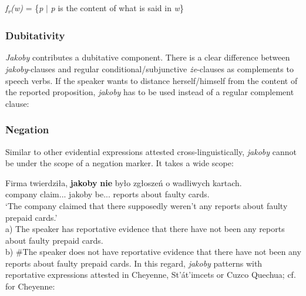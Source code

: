 \documentclass[output=paper]{langsci/langscibook}
\begin{document}
\ea  \emph{f\textsubscript{r}(w)} = \{\emph{p} $ \mid $ \emph{p} is the content of what is said in \emph{w}\} \z

 \subsubsection{Dubitativity}
 \emph{Jakoby} contributes a dubitative component. There is a clear difference between \emph{jakoby}-clauses and regular conditional\slash subjunctive \emph{że}-clauses as complements to speech verbs. If the speaker wants to distance herself\slash himself from the content of the reported proposition, \emph{jakoby} has to be used instead of a regular complement clause:

\ea {}
\z\z
\subsubsection{Negation}
Similar to other evidential expressions attested cross-linguistically, \emph{jakoby} cannot be under the scope of a negation marker. It takes a wide scope:

\ea \gll Firma twierdziła, \textbf{jakoby} \textbf{nie} było zgłoszeń o wadliwych kartach.\\
		company claim.{\lptcp}.{\sg}.{\fem} jakoby {\negation} be.{\lptcp}.{\sg}.{\n} reports about faulty cards.{\LOC}\\
\glt		`The company claimed that there supposedly weren't any reports about faulty prepaid cards.'\\
	a) The speaker has reportative evidence that there have not been any reports about faulty prepaid cards.\\
	b) \#The speaker does not have reportative evidence that there have not been any reports about faulty prepaid cards.
\z
In this regard, \emph{jakoby} patterns with reportative expressions attested in Cheyenne, St'át'imcets or Cuzco Quechua; cf.  for Cheyenne:
\end{document}
